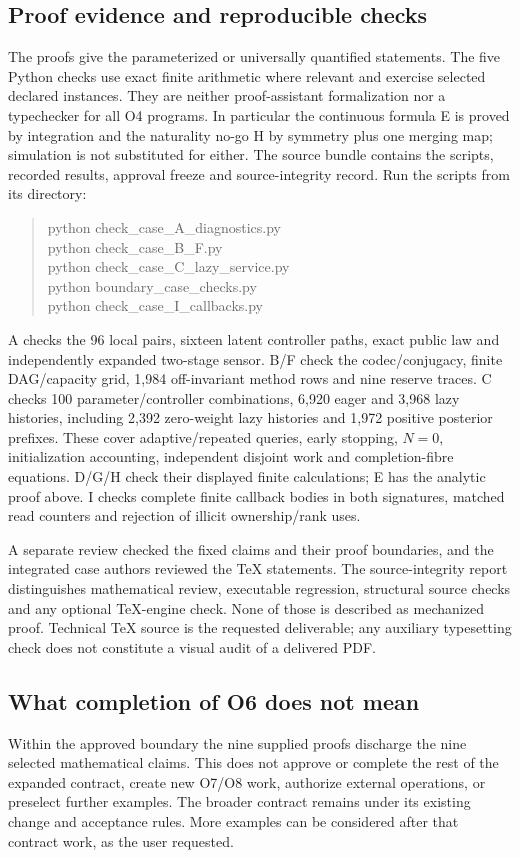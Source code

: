 \subsection{Proof evidence and reproducible checks}
The proofs give the parameterized or universally quantified statements.
The five Python checks use exact finite arithmetic where relevant and
exercise selected declared instances. They are neither proof-assistant
formalization nor a typechecker for all O4 programs. In particular the
continuous formula E is proved by integration and the naturality no-go H
by symmetry plus one merging map; simulation is not substituted for either.
The source bundle contains the scripts, recorded results, approval freeze
and source-integrity record. Run the scripts from its directory:
\begin{quote}\ttfamily\small
python check\_case\_A\_diagnostics.py\\
python check\_case\_B\_F.py\\
python check\_case\_C\_lazy\_service.py\\
python boundary\_case\_checks.py\\
python check\_case\_I\_callbacks.py
\end{quote}
A checks the 96 local pairs, sixteen latent controller paths, exact
public law and independently expanded two-stage sensor. B/F check the
codec/conjugacy, finite DAG/capacity grid, 1,984 off-invariant method
rows and nine reserve traces.
C checks 100 parameter/controller combinations, 6,920 eager and 3,968
lazy histories, including 2,392 zero-weight lazy histories and 1,972
positive posterior prefixes. These cover adaptive/repeated queries,
early stopping, $N=0$, initialization accounting, independent disjoint
work and completion-fibre equations. D/G/H check their displayed finite
calculations; E has the analytic proof above. I checks complete finite
callback bodies in both signatures, matched read counters and rejection
of illicit ownership/rank uses.

A separate review checked the fixed claims and their proof boundaries,
and the integrated case authors reviewed the TeX statements. The
source-integrity report distinguishes mathematical review, executable
regression, structural source checks and any optional TeX-engine check.
None of those is described as mechanized proof. Technical TeX source is
the requested deliverable; any auxiliary typesetting check does not
constitute a visual audit of a delivered PDF.

\subsection{What completion of O6 does not mean}
Within the approved boundary the nine supplied proofs discharge the nine
selected mathematical claims. This does not approve or complete the rest
of the expanded contract, create new O7/O8 work, authorize external
operations, or preselect further examples. The broader contract remains
under its existing change and acceptance rules. More examples can be
considered after that contract work, as the user requested.

